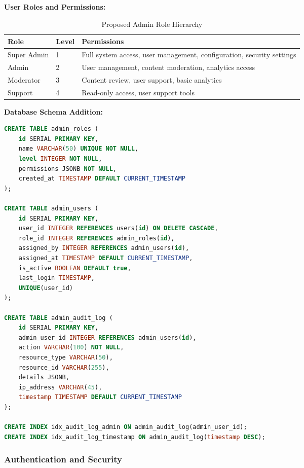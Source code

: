 \textbf{User Roles and Permissions:}

\begin{table}[H]
\centering
\caption{Proposed Admin Role Hierarchy}
\begin{tabular}{@{}llp{6cm}@{}}
\toprule
\textbf{Role} & \textbf{Level} & \textbf{Permissions} \\
\midrule
Super Admin & 1 & Full system access, user management, configuration, security settings \\
Admin & 2 & User management, content moderation, analytics access \\
Moderator & 3 & Content review, user support, basic analytics \\
Support & 4 & Read-only access, user support tools \\
\bottomrule
\end{tabular}
\end{table}

\textbf{Database Schema Addition:}

\begin{lstlisting}[language=SQL, caption=Admin Roles Schema]
CREATE TABLE admin_roles (
    id SERIAL PRIMARY KEY,
    name VARCHAR(50) UNIQUE NOT NULL,
    level INTEGER NOT NULL,
    permissions JSONB NOT NULL,
    created_at TIMESTAMP DEFAULT CURRENT_TIMESTAMP
);

CREATE TABLE admin_users (
    id SERIAL PRIMARY KEY,
    user_id INTEGER REFERENCES users(id) ON DELETE CASCADE,
    role_id INTEGER REFERENCES admin_roles(id),
    assigned_by INTEGER REFERENCES admin_users(id),
    assigned_at TIMESTAMP DEFAULT CURRENT_TIMESTAMP,
    is_active BOOLEAN DEFAULT true,
    last_login TIMESTAMP,
    UNIQUE(user_id)
);

CREATE TABLE admin_audit_log (
    id SERIAL PRIMARY KEY,
    admin_user_id INTEGER REFERENCES admin_users(id),
    action VARCHAR(100) NOT NULL,
    resource_type VARCHAR(50),
    resource_id VARCHAR(255),
    details JSONB,
    ip_address VARCHAR(45),
    timestamp TIMESTAMP DEFAULT CURRENT_TIMESTAMP
);

CREATE INDEX idx_audit_log_admin ON admin_audit_log(admin_user_id);
CREATE INDEX idx_audit_log_timestamp ON admin_audit_log(timestamp DESC);
\end{lstlisting}

\subsubsection{Authentication and Security}

